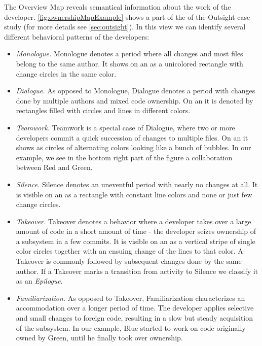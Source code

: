 The Overview Map reveals semantical information about the work of the developer. \autoref{fig:ownershipMapExample} shows a part of the \omap of the Outsight case study (for more details see \autoref{sec:outsight}). In this view we can identify several different behavioral patterns of the developers:

\begin{itemize}

\item \emph{Monologue.} Monologue denotes a period where all changes and most files belong to the same author. It shows on an \omap as a unicolored rectangle with change circles in the same color.

\item \emph{Dialogue.} As opposed to Monologue, Dialogue denotes a period with changes done by multiple authors and mixed code ownership. On an \omap it is denoted by rectangles filled with circles and lines in different colors.

\item \emph{Teamwork.} Teamwork is a special case of Dialogue, where two or more developers commit a quick succession of changes to multiple files. On an \omap it shows as circles of alternating colors looking like a bunch of bubbles. In our example, we see in the bottom right part of the figure a collaboration between Red and Green.

\item \emph{Silence.} Silence denotes an uneventful period with nearly no changes at all. It is visible on an \omap as a rectangle with constant line colors and none or just few change circles.

\item \emph{Takeover.} Takeover denotes a behavior where a developer takes over a large amount of code in a short amount of time \-- \ie the developer seizes ownership of a subsystem in a few commits. It is visible on an \omap as a vertical stripe of single color circles together with an ensuing change of the lines to that color. A Takeover is commonly followed by subsequent changes done by the same author. If a Takeover marks a transition from activity to Silence we classify it as an \emph{Epilogue}.

\item \emph{Familiarization.} As opposed to Takeover, Familiarization characterizes an accommodation over a longer period of time. The developer applies selective and small changes to foreign code, resulting in a slow but steady acquisition of the subsystem. In our example, Blue started to work on code originally owned by Green, until he finally took over ownership.


\end{itemize}

